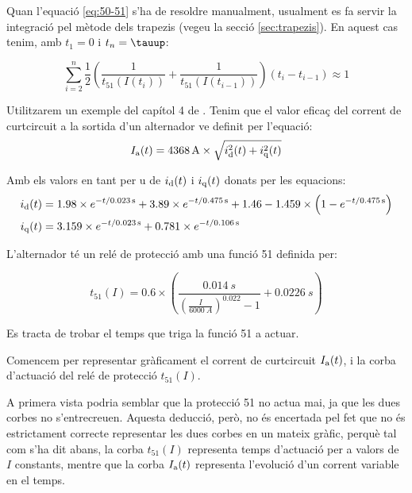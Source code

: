 Quan l'equació \eqref{eq:50-51} s'ha de resoldre manualment, usualment es fa servir la integració pel mètode dels trapezis (vegeu la secció \vref{sec:trapezis}). En aquest cas tenim, amb $t_1 = 0$ i $t_n = \tauup$:

\begin{equation}\label{eq:50-51-aprox}
	\sum_{i=2}^n \frac{1}{2} \left( \frac{1}{t_{51}(I(t_i))} + \frac{1}{t_{51}(I(t_{i-1}))} \right) (t_i - t_{i-1}) \approx 1
\end{equation}


\begin{exemple}\label{ex:ProtInvIntVar}
	\addcontentsxms{\ProtInvIntVar}	
	Utilitzarem un exemple del capítol 4 de \cite{REI}. Tenim que el valor eficaç del corrent de curtcircuit a la sortida d'un alternador ve definit per l'equació:
	\[
		I_\mathrm{a}(t) = \qty{4368}{A} \times \sqrt{i_\mathrm{d}^2(t) + i_\mathrm{q}^2(t)}
	\]
	
	Amb els valors en tant per u de $i_\mathrm{d}(t)$ i $i_\mathrm{q}(t)$ donats per les equacions:
	\begin{align*}
		i_\mathrm{d}(t) &= \num{1,98} \times e^{-t/\qty{0,023}{s}} + \num{3,89} \times e^{-t/\qty{0,475}{s}} + \num{1,46} - \num{1,459} \times \left( 1 - e^{-t/\qty{0,475}{s}}\right) \\
		i_\mathrm{q}(t) &= 	\num{3,159} \times e^{-t/\qty{0,023}{s}} + \num{0,781} \times e^{-t/\qty{0,106}{s}}
	\end{align*}
	
	L'alternador té un relé de protecció amb una funció 51 definida per:
	
	\[
		t_{51}(I) = \num{0,6} \times \left(  \frac{\qty{0,014}{s}}{\left( \frac{I}{\qty{6000}{A}} \right) ^{\num{0,022}} -1} + \qty{0,0226}{s} \right)  
	\]
	
	Es tracta de trobar el temps que triga la funció 51 a actuar.
	
	Comencem per representar gràficament el corrent de curtcircuit $I_\mathrm{a}(t)$, i la corba d'actuació del relé de protecció $t_{51}(I)$.
	
	\begin{center}
		
	\end{center}
 	
 	A primera vista podria semblar que la protecció 51 no actua mai, ja que les dues corbes no s'entrecreuen. Aquesta deducció, però,  no és encertada pel fet que  no és estrictament correcte representar les dues corbes en un mateix gràfic, perquè tal com s'ha dit abans, la corba $t_{51}(I)$ representa temps d'actuació per a valors de $I$ constants, mentre que la corba $I_\mathrm{a}(t)$ representa l'evolució d'un corrent variable en el temps.
 	

\end{exemple}

